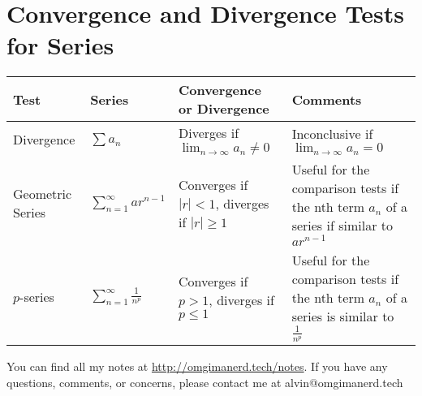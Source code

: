 \documentclass[letterpaper, 12pt]{math}
\begin{document}
\section*{Convergence and Divergence Tests for Series}
\bgroup
  \def\arraystretch{2}
  \begin{tabular}{| m{2cm} | m{2cm} | m{5cm} | m{6cm} |}
    \hline
    Test & Series & Convergence or Divergence & Comments \\
    \hline
      Divergence &
      \( \sum{a_{n}} \) &
      Diverges if \( \lim_{n\to\infty}{a_{n}} \neq 0 \) &
      Inconclusive if \( \lim_{n\to\infty}{a_{n}} = 0 \) \\
    \hline
      Geometric Series &
      \( \sum_{n=1}^{\infty}{ar^{n-1}} \) &
      Converges if \( |r| < 1 \), diverges if \( |r| \geq 1 \) &
      Useful for the comparison tests if the nth term \( a_{n} \) of a series
        if similar to \( ar^{n-1} \) \\
    \hline
      \( p \)-series &
      \( \sum_{n=1}^{\infty}\frac{1}{n^{p}} \) &
      Converges if \( p > 1 \), diverges if \( p \leq 1 \) &
      Useful for the comparison tests if the nth term \( a_{n} \) of a series
      is similar to \( \frac{1}{n^{p}} \) \\
    \hline
  \end{tabular}
\egroup

\begin{center}
  You can find all my notes at \url{http://omgimanerd.tech/notes}. If you have
  any questions, comments, or concerns, please contact me at
  alvin@omgimanerd.tech
\end{center}
\end{document}
